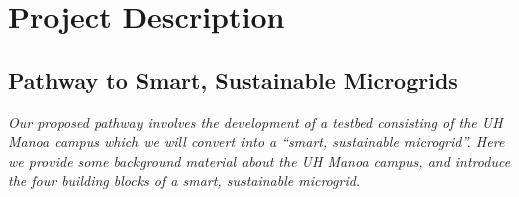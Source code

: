 \documentclass{proposalnsf}
\begin{document}

\section{Project Description}

\tableofcontents



\subsection{Pathway to Smart, Sustainable Microgrids} 

{\em Our proposed pathway involves the development of a testbed consisting
  of the UH Manoa campus which we will convert into a ``smart, sustainable
  microgrid''.  Here we provide some background material about the UH Manoa
  campus, and introduce the four building blocks of a smart, sustainable
  microgrid.}

















\newpage



\end{document}
